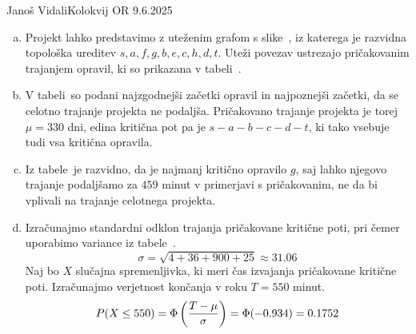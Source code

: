 \begin{naloga}{Janoš Vidali}{Kolokvij OR 9.6.2025}
\begin{odgovor}
\begin{enumerate}[(a)]
\item Projekt lahko predstavimo z uteženim grafom s slike~\fig,
iz katerega je raz\-vid\-na topološka ureditev
$s, a, f, g, b, e, c, h, d, t$.
Uteži povezav ustrezajo pričakovanim trajanjem opravil,
ki so prikazana v tabeli~.

\item V tabeli~
so podani najzgodnejši začetki opravil in najpoznejši začetki,
da se celotno trajanje projekta ne podaljša.
Pričakovano trajanje projekta je torej $\mu = 330$ dni,
edina kritična pot pa je $s - a - b - c - d - t$,
ki tako vsebuje tudi vsa kritična opravila.

\item Iz tabele~ je razvidno,
da je najmanj kritično opravilo $g$,
saj lahko njegovo trajanje
podaljšamo za $459$ minut v primerjavi s pričakovanim,
ne da bi vplivali na trajanje celotnega projekta.

\item Izračunajmo standardni odklon trajanja pričakovane kritične poti,
pri čemer uporabimo variance iz tabele~.
$$
\sigma = \sqrt{4 + 36 + 900 + 25} \approx 31.06
$$
Naj bo $X$ slučajna spremenljivka,
ki meri čas izvajanja pričakovane kritične poti.
Izračunajmo verjetnost končanja v roku $T = 550$ minut.
$$
P(X \le 550) = \Phi\left({T - \mu \over \sigma}\right) = \Phi(-0.934) = 0.1752
$$
\end{enumerate}
%
\begin{slika}
\makebox[\textwidth][c]{
\pgfslika
}
\end{slika}
%
\begin{tabela}
\end{tabela}
\end{odgovor}
\end{naloga}
